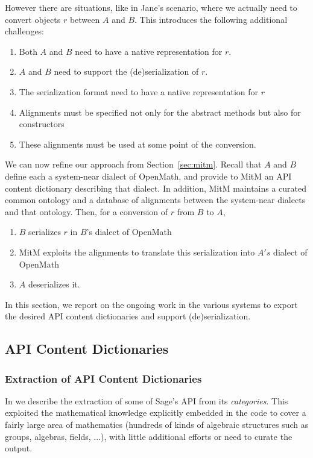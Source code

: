 However there are situations, like in Jane's scenario, where we
actually need to convert objects $r$ between $A$ and $B$. This
introduces the following additional challenges:
\begin{enumerate}
\item Both $A$ and $B$ need to have a native representation for $r$.
\item $A$ and $B$ need to support the (de)serialization of $r$.
\item The serialization format need to have a native representation
  for $r$
\item Alignments must be specified not only for the abstract methods
  but also for constructors
\item These alignments must be used at some point of the conversion.
\end{enumerate}

We can now refine our approach from Section~\ref{sec:mitm}. Recall
that $A$ and $B$ define each a system-near dialect of OpenMath, and
provide to MitM an API content dictionary describing that dialect. In
addition, MitM maintains a curated common ontology and a database of
alignments between the system-near dialects and that ontology. Then,
for a conversion of $r$ from $B$ to $A$,
\begin{enumerate}
\item $B$ serializes $r$ in $B$'s dialect of OpenMath
\item MitM exploits the alignments to translate this serialization
  into $A's$ dialect of OpenMath
\item $A$ deserializes it.
\end{enumerate}

In this section, we report on the ongoing work in the various systems
to export the desired API content dictionaries and support
(de)serialization.

\subsection{\Sage API Content Dictionaries}

\subsubsection{Extraction of \Sage API Content Dictionaries}

In \cite{DehKohKon:iop16} we describe the extraction of some of Sage's
API from its \emph{categories}. This exploited the mathematical
knowledge explicitly embedded in the code to cover a fairly large area
of mathematics (hundreds of kinds of algebraic structures such as
groups, algebras, fields, ...), with little additional efforts or need
to curate the output.

